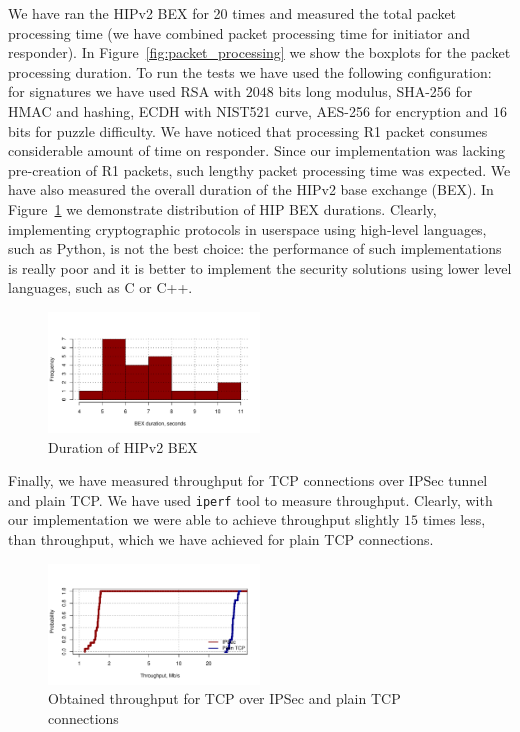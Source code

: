 We have ran the HIPv2 BEX for 20 times and measured the total packet processing time (we have combined packet 
processing time for initiator and responder). In Figure~\ref{fig:packet_processing} we show the boxplots for 
the packet processing duration. To run the tests we have used the following configuration: for signatures 
we have used RSA with $2048$ bits long modulus, SHA-256 for HMAC and hashing, ECDH with NIST521 curve, 
AES-256 for encryption and $16$ bits for puzzle difficulty. We have noticed that processing R1 packet consumes considerable
amount of time on responder. Since our implementation was lacking pre-creation of R1 packets, such lengthy packet 
processing time was expected. We have also measured the overall duration of the HIPv2 base exchange (BEX). 
In Figure~\ref{fig:duration_bex} we demonstrate distribution of HIP BEX durations. Clearly, implementing 
cryptographic protocols in userspace using high-level languages, such as Python, is not the best choice: the performance
of such implementations is really poor and it is better to implement the security solutions using lower 
level languages, such as C or C++.

\begin{figure}
	\includegraphics[width=0.5\textwidth]{graphics/duration_bex.pdf}
	\caption{Duration of HIPv2 BEX}
	\label{fig:duration_bex}
\end{figure}

Finally, we have measured throughput for TCP connections over IPSec tunnel and plain TCP. We have used
\texttt{iperf} tool to measure throughput. Clearly, with our implementation we were able to achieve
throughput slightly $15$ times less, than throughput, which we have achieved for plain TCP connections.

\begin{figure}
	\includegraphics[width=0.5\textwidth]{graphics/throughput.pdf}
	\caption{Obtained throughput for TCP over IPSec and plain TCP connections}
	\label{fig:throughput}
\end{figure}
